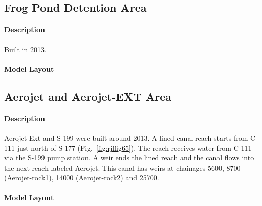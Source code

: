 \clearpage


\subsection{Frog Pond Detention Area}

\paragraph{Description}
Built in 2013.

\paragraph{Model Layout}



\clearpage
\subsection{Aerojet and Aerojet-EXT Area}

\paragraph{Description}
Aerojet Ext and S-199 were built around 2013.
A lined canal reach starts from C-111 just north of S-177 (Fig.~\ref{fig:rjffig65}).
The reach receives water from C-111 via the S-199 pump station.
A weir ends the lined reach and the canal flows into the next reach labeled Aerojet.
This canal has weirs at chainages 5600, 8700 (Aerojet-rock1), 14000 (Aerojet-rock2) and 25700.

\paragraph{Model Layout}



